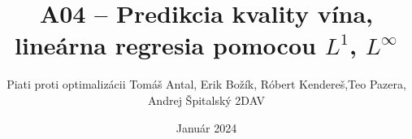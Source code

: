 \documentclass{beamer}
\title{A04 – Predikcia kvality vína, lineárna regresia pomocou $L^1$, $L^{\infty}$}
\author{Piati proti optimalizácii \newline Tomáš Antal, Erik Božík, Róbert Kendereš,\newline Teo Pazera, Andrej Špitalský \newline 2DAV}
\date{Január 2024}
\begin{document}
\frame{\titlepage}









\end{document}
